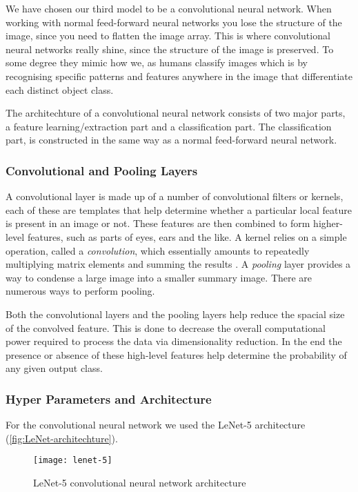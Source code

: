 \documentclass[../main.tex]{subfiles}
\begin{document}
We have chosen our third model to be a convolutional neural 
network.
When working with normal feed-forward neural networks you lose the 
structure of the image, since you need to flatten the image array.
This is where convolutional neural networks really shine, since 
the structure of the image is preserved.
To some degree they mimic how we, as humans classify images which 
is by recognising specific patterns and features anywhere in the 
image that differentiate each distinct object class.

The architechture of a convolutional neural network consists of 
two major parts, a feature learning/extraction part and a 
classification part. The classification part, is constructed in 
the same way as a normal feed-forward neural network.


\subsubsection{Convolutional and Pooling Layers}

A convolutional layer is made up of a number of convolutional 
filters or kernels, each of these are templates that help 
determine whether a particular local feature is present in an 
image or not. These features are then combined to form higher-level features, such as parts of eyes, ears and the like.
A kernel relies on a simple operation, called a 
\textit{convolution}, which essentially amounts to repeatedly 
multiplying matrix elements and summing the results 
\autocite{JamesStatisticalLearning}. 
A \textit{pooling} layer provides a way to condense a large image 
into a smaller summary image. There are numerous ways to perform 
pooling.

Both the convolutional layers and the pooling layers help reduce 
the spacial size of the convolved feature. This is done to 
decrease the overall computational power required to process the 
data via dimensionality reduction. In the end the presence or 
absence of these high-level features help determine the 
probability of any given output class.


\subsubsection{Hyper Parameters and Architecture}

For the convolutional neural network we used the LeNet-5 
architecture (\autoref{fig:LeNet-architechture}). 

\begin{figure}[ht]
    \centering
    \texttt{[image: lenet-5]}
    \caption{LeNet-5 convolutional neural network architecture}
    \label{fig:LeNet-architechture}
\end{figure}
\end{document}
